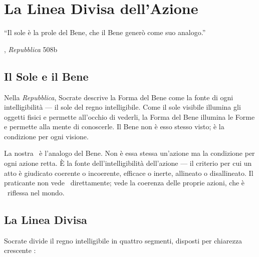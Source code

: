 \chapter{La Linea Divisa dell'Azione}

\epigraph{``Il sole \`e la prole del Bene, che il Bene gener\`o come suo
analogo.''}{\textcite{plato1997complete}, \emph{Repubblica} 508b}

\section{Il Sole e il Bene}

Nella \emph{Repubblica}, Socrate descrive la Forma del Bene come la
fonte di ogni intelligibilit\`a --- il sole del regno intelligibile.
Come il sole visibile illumina gli oggetti fisici e permette all'occhio
di vederli, la Forma del Bene illumina le Forme e permette alla mente
di conoscerle. Il Bene non \`e esso stesso visto; \`e la condizione
per ogni visione.

La nostra \physis\ \`e l'analogo del Bene. Non \`e essa stessa
un'azione ma la condizione per ogni azione retta. \`E la fonte
dell'intelligibilit\`a dell'azione --- il criterio per cui un atto
\`e giudicato coerente o incoerente, efficace o inerte, allineato o
disallineato. Il praticante non vede \physis\ direttamente; vede la
coerenza delle proprie azioni, che \`e \physis\ riflessa nel mondo.

\section{La Linea Divisa}

Socrate divide il regno intelligibile in quattro segmenti, disposti per
chiarezza crescente \parencite[VI.509d--511e]{plato1997complete}:

